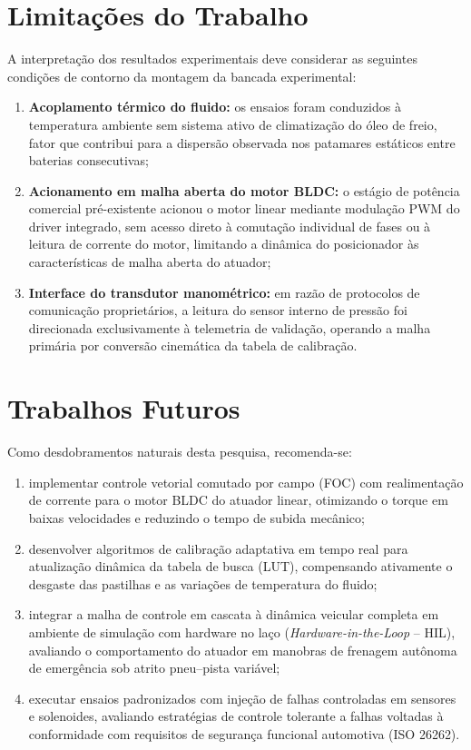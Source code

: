 \section[Limitações do Trabalho]{Limitações do Trabalho}
\label{sec:conclusao-limitacoes}

A interpretação dos resultados experimentais deve considerar as seguintes condições de contorno da montagem da bancada experimental:
\begin{enumerate}
    \item \textbf{Acoplamento térmico do fluido:} os ensaios foram conduzidos à temperatura ambiente sem sistema ativo de climatização do óleo de freio, fator que contribui para a dispersão observada nos patamares estáticos entre baterias consecutivas;
    \item \textbf{Acionamento em malha aberta do motor BLDC:} o estágio de potência comercial pré-existente acionou o motor linear mediante modulação PWM do driver integrado, sem acesso direto à comutação individual de fases ou à leitura de corrente do motor, limitando a dinâmica do posicionador às características de malha aberta do atuador;
    \item \textbf{Interface do transdutor manométrico:} em razão de protocolos de comunicação proprietários, a leitura do sensor interno de pressão foi direcionada exclusivamente à telemetria de validação, operando a malha primária por conversão cinemática da tabela de calibração.
\end{enumerate}

\section[Trabalhos Futuros]{Trabalhos Futuros}
\label{sec:conclusao-trabalhos-futuros}

Como desdobramentos naturais desta pesquisa, recomenda-se:
\begin{enumerate}
    \item implementar controle vetorial comutado por campo (FOC) com realimentação de corrente para o motor BLDC do atuador linear, otimizando o torque em baixas velocidades e reduzindo o tempo de subida mecânico;
    \item desenvolver algoritmos de calibração adaptativa em tempo real para atualização dinâmica da tabela de busca (LUT), compensando ativamente o desgaste das pastilhas e as variações de temperatura do fluido;
    \item integrar a malha de controle em cascata à dinâmica veicular completa em ambiente de simulação com hardware no laço (\textit{Hardware-in-the-Loop} -- HIL), avaliando o comportamento do atuador em manobras de frenagem autônoma de emergência sob atrito pneu--pista variável;
    \item executar ensaios padronizados com injeção de falhas controladas em sensores e solenoides, avaliando estratégias de controle tolerante a falhas voltadas à conformidade com requisitos de segurança funcional automotiva (ISO 26262).
\end{enumerate}
